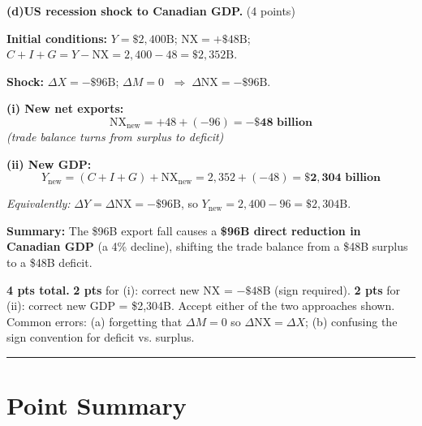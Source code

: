 \documentclass[11pt]{article}
\begin{document}
\bigskip

\noindent\textbf{(d)}\quad\textbf{US recession shock to Canadian GDP.}
\quad(4 points)

\begin{solutionbox}
\textbf{Initial conditions:} $Y = \$2{,}400\text{B}$; $\text{NX} = +\$48\text{B}$;
$C + I + G = Y - \text{NX} = 2{,}400 - 48 = \$2{,}352\text{B}$.

\medskip
\textbf{Shock:} $\Delta X = -\$96\text{B}$; $\Delta M = 0$
$\;\Rightarrow\; \Delta\text{NX} = -\$96\text{B}$.

\medskip
\textbf{(i) New net exports:}
\[\text{NX}_{\text{new}} = +48 + (-96) = \mathbf{-\$48\text{ billion}}\]
\textit{(trade balance turns from surplus to deficit)}

\medskip
\textbf{(ii) New GDP:}
\[Y_{\text{new}} = (C + I + G) + \text{NX}_{\text{new}}
  = 2{,}352 + (-48) = \mathbf{\$2{,}304\text{ billion}}\]

\textit{Equivalently:} $\Delta Y = \Delta\text{NX} = -\$96\text{B}$,
so $Y_{\text{new}} = 2{,}400 - 96 = \$2{,}304\text{B}$. \checkmark

\medskip
\noindent\textbf{Summary:} The \$96B export fall causes a \textbf{\$96B direct
reduction in Canadian GDP} (a 4\% decline), shifting the trade balance from a
\$48B surplus to a \$48B deficit.
\end{solutionbox}

\begin{rubricbox}
\small
\textbf{4 pts total.} \textbf{2 pts} for (i): correct new NX = $-\$48$B (sign required).
\textbf{2 pts} for (ii): correct new GDP = \$2,304B. Accept either of the two approaches
shown. Common errors: (a) forgetting that $\Delta M=0$ so $\Delta\text{NX}=\Delta X$; (b) confusing the
sign convention for deficit vs. surplus.
\end{rubricbox}


\vspace{1em}
{\color{UNBCGold}\hrule height 0.6pt}

\section{Point Summary}
\end{document}
